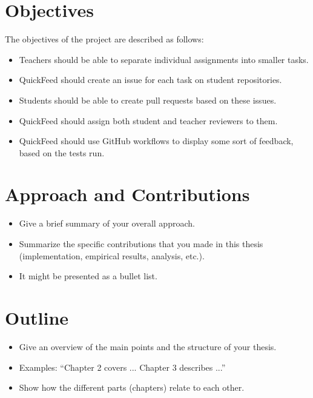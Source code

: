 \section{Objectives}

The objectives of the project are described as follows:
\begin{itemize}
    \item Teachers should be able to separate individual assignments into smaller tasks.
    \item QuickFeed should create an issue for each task on student repositories.
    \item Students should be able to create pull requests based on these issues.
    \item QuickFeed should assign both student and teacher reviewers to them.
    \item QuickFeed should use GitHub workflows to display some sort of feedback, based on the tests run.
\end{itemize}

\section{Approach and Contributions}

\begin{itemize}
\item Give a brief summary of your overall approach.
\item Summarize the specific contributions that you made in this thesis (implementation, empirical results, analysis, etc.).
\item It might be presented as a bullet list.
\end{itemize}


\section{Outline}

\begin{itemize}
\item Give an overview of the main points and the structure of your thesis.
\item Examples: ``Chapter 2 covers ...  Chapter 3 describes ...''
\item Show how the different parts (chapters) relate to each other.
\end{itemize}
